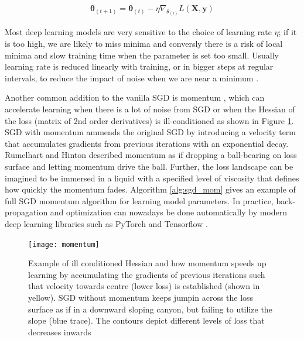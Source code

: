 \documentclass{report}
\begin{document}
\begin{align} \label{sgd_eq}
  \pmb{\theta}_{(t+1)}=\pmb{\theta}_{(t)} - \eta \nabla_{\theta_{(t)}}L(\mathbf{X}, \mathbf{y})
\end{align}

Most deep learning models are very sensitive to the choice of learning rate $\eta$; if it is too high, we are likely to miss minima and conversly there is a risk of local minima and slow training time when the parameter is set too small. Usually learning rate is reduced linearly with training, or in bigger steps at regular intervals, to reduce the impact of noise when we are near a minimum \cite{Goodfellow2016}.

Another common addition to the vanilla SGD is momentum \cite{Rumelhart1985}, which can accelerate learning when there is a lot of noise from SGD or when the Hessian of the loss (matrix of 2nd order derivatives) is ill-conditioned as shown in Figure \ref{fig:momentum}. SGD with momentum ammends the original SGD by introducing a velocity term that accumulates gradients from previous iterations with an exponential decay. Rumelhart and Hinton \cite{Rumelhart1985} described momentum as if dropping a ball-bearing on loss surface and letting momentum drive the ball. Further, the loss landscape can be imagined to be immersed in a liquid with a specified level of viscosity that defines how quickly the momentum fades. Algorithm \ref{alg:sgd_mom} gives an example of full SGD momentum algorithm for learning model parameters. In practice, back-propagation and optimization can nowadays be done automatically by modern deep learning libraries such as PyTorch \cite{Paszke2017} and Tensorflow \cite{Abadi2015}. 

\begin{figure}
  \centering
	\texttt{[image: momentum]}
	\caption{Example of ill conditioned Hessian and how momentum speeds up learning by accumulating the gradients of previous iterations such that velocity towards centre (lower loss) is established (shown in yellow). SGD without momentum keeps jumpin across the loss surface as if in a downward sloping canyon, but failing to utilize the slope (blue trace). The contours depict different levels of loss that decreases inwards}
	\label{fig:momentum}
\end{figure}
\end{document}
